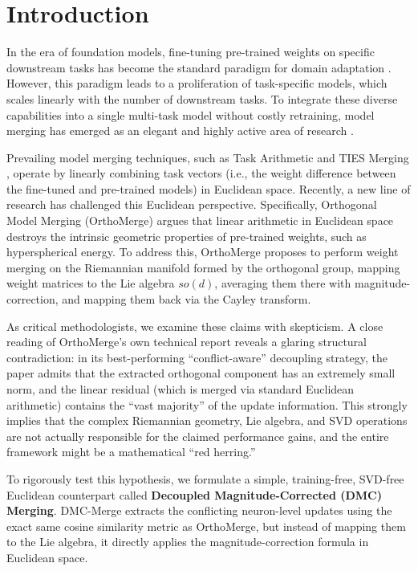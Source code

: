 \documentclass{article}
\begin{document}
\section{Introduction}
\label{introduction}

In the era of foundation models, fine-tuning pre-trained weights on specific downstream tasks has become the standard paradigm for domain adaptation \cite{devlin2018bert, radford2021clip}. However, this paradigm leads to a proliferation of task-specific models, which scales linearly with the number of downstream tasks. To integrate these diverse capabilities into a single multi-task model without costly retraining, model merging has emerged as an elegant and highly active area of research \cite{wortsman2022model, Ilharco2022EditingMW, brown2020gpt3, langley00}.

Prevailing model merging techniques, such as Task Arithmetic \cite{Ilharco2022EditingMW} and TIES Merging \cite{Yadav2023TIESMergingRI}, operate by linearly combining task vectors (i.e., the weight difference between the fine-tuned and pre-trained models) in Euclidean space. Recently, a new line of research has challenged this Euclidean perspective. Specifically, Orthogonal Model Merging (OrthoMerge) \cite{yang2025orthomerge} argues that linear arithmetic in Euclidean space destroys the intrinsic geometric properties of pre-trained weights, such as hyperspherical energy. To address this, OrthoMerge proposes to perform weight merging on the Riemannian manifold formed by the orthogonal group, mapping weight matrices to the Lie algebra $so(d)$, averaging them there with magnitude-correction, and mapping them back via the Cayley transform.

As critical methodologists, we examine these claims with skepticism. A close reading of OrthoMerge's own technical report reveals a glaring structural contradiction: in its best-performing ``conflict-aware'' decoupling strategy, the paper admits that the extracted orthogonal component has an extremely small norm, and the linear residual (which is merged via standard Euclidean arithmetic) contains the ``vast majority'' of the update information. This strongly implies that the complex Riemannian geometry, Lie algebra, and SVD operations are not actually responsible for the claimed performance gains, and the entire framework might be a mathematical ``red herring.''

To rigorously test this hypothesis, we formulate a simple, training-free, SVD-free Euclidean counterpart called \textbf{Decoupled Magnitude-Corrected (DMC) Merging}. DMC-Merge extracts the conflicting neuron-level updates using the exact same cosine similarity metric as OrthoMerge, but instead of mapping them to the Lie algebra, it directly applies the magnitude-correction formula in Euclidean space. 
\end{document}
